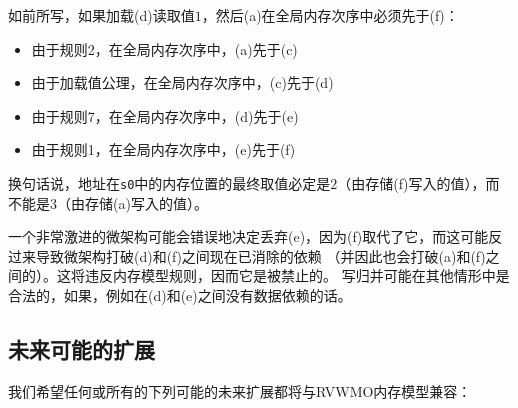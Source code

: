 如前所写，如果加载(d)读取值$1$，然后(a)在全局内存次序中必须先于(f)：
\begin{itemize}
  \item 由于规则2，在全局内存次序中，(a)先于(c)
  \item 由于加载值公理，在全局内存次序中，(c)先于(d)
  \item 由于规则7，在全局内存次序中，(d)先于(e)
  \item 由于规则1，在全局内存次序中，(e)先于(f)
\end{itemize}
换句话说，地址在{\tt s0}中的内存位置的最终取值必定是$2$（由存储(f)写入的值），而不能是$3$（由存储(a)写入的值）。

一个非常激进的微架构可能会错误地决定丢弃(e)，因为(f)取代了它，而这可能反过来导致微架构打破(d)和(f)之间现在已消除的依赖
（并因此也会打破(a)和(f)之间的）。这将违反内存模型规则，因而它是被禁止的。
写归并可能在其他情形中是合法的，如果，例如在(d)和(e)之间没有数据依赖的话。

\subsection{未来可能的扩展}

我们希望任何或所有的下列可能的未来扩展都将与RVWMO内存模型兼容：

